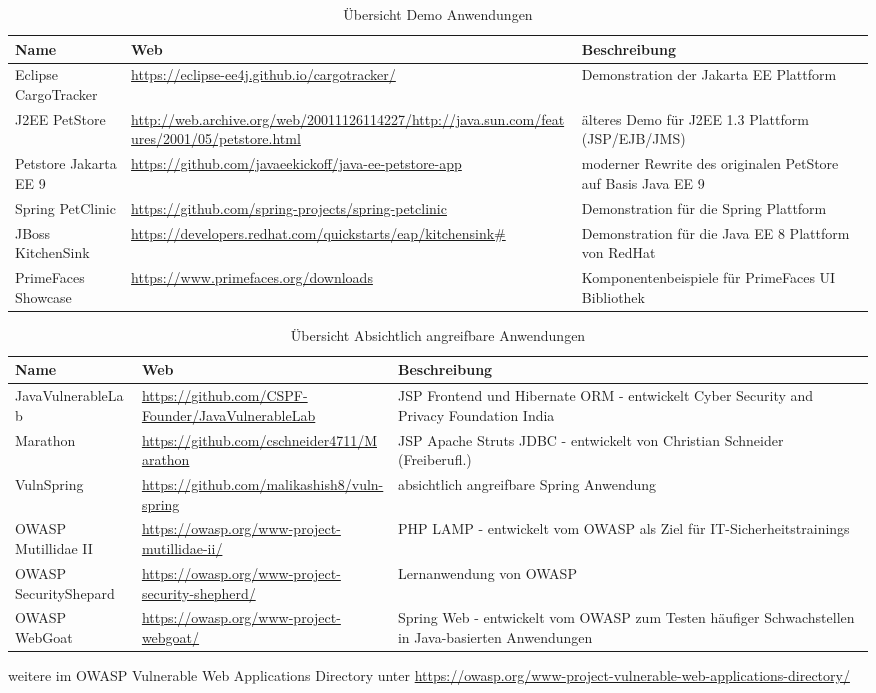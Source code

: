 \begin{table}[h]
  \centering
  \begin{tabular}{lp{5cm}p{5cm}}
    \toprule
    \textbf{Name} & \textbf{Web} & \textbf{Beschreibung}\\
    \midrule
    Eclipse CargoTracker & \url{https://eclipse-ee4j.github.io/cargotracker/} & Demonstration der Jakarta EE Plattform\\
    J2EE PetStore & \url{http://web.archive.org/web/20011126114227/http://java.sun.com/features/2001/05/petstore.html} & älteres Demo für J2EE 1.3 Plattform (JSP/EJB/JMS)\\
    Petstore Jakarta EE 9 & \url{https://github.com/javaeekickoff/java-ee-petstore-app} & moderner Rewrite des originalen PetStore auf Basis Java EE 9 \\
    Spring PetClinic & \url{https://github.com/spring-projects/spring-petclinic} & Demonstration für die Spring Plattform \\
    JBoss KitchenSink & \url{https://developers.redhat.com/quickstarts/eap/kitchensink#} & Demonstration für die Java EE 8 Plattform von RedHat\\
    PrimeFaces Showcase & \url{https://www.primefaces.org/downloads} & Komponentenbeispiele für PrimeFaces UI Bibliothek\\
    \bottomrule
  \end{tabular}
  \caption{Übersicht Demo Anwendungen}
  \label{tab:exampleapp}
\end{table}

\begin{table}[h]
  \centering
  \begin{tabular}{lp{5cm}p{5cm}}
    \toprule
    \textbf{Name} & \textbf{Web} & \textbf{Beschreibung} \\
    \midrule
    JavaVulnerableLab & \url{https://github.com/CSPF-Founder/JavaVulnerableLab} & JSP Frontend und Hibernate ORM - entwickelt Cyber Security and Privacy Foundation India \\
    Marathon & \url{https://github.com/cschneider4711/Marathon} &  JSP Apache Struts JDBC  - entwickelt von Christian Schneider (Freiberufl.)\\
    VulnSpring & \url{https://github.com/malikashish8/vuln-spring} &  absichtlich angreifbare Spring Anwendung\\
    OWASP Mutillidae II & \url{https://owasp.org/www-project-mutillidae-ii/} &  PHP LAMP - entwickelt vom OWASP als Ziel für IT-Sicherheitstrainings \\
    OWASP SecurityShepard & \url{https://owasp.org/www-project-security-shepherd/} & Lernanwendung von OWASP\\
    OWASP WebGoat & \url{https://owasp.org/www-project-webgoat/} &  Spring Web - entwickelt vom OWASP zum Testen häufiger Schwachstellen in Java-basierten Anwendungen\\
    \bottomrule
  \end{tabular}
  \caption{Übersicht Absichtlich angreifbare Anwendungen}
  \medskip
  \small
  weitere im OWASP Vulnerable Web Applications Directory unter \url{https://owasp.org/www-project-vulnerable-web-applications-directory/}
  \label{tab:vulnapp}
\end{table}


